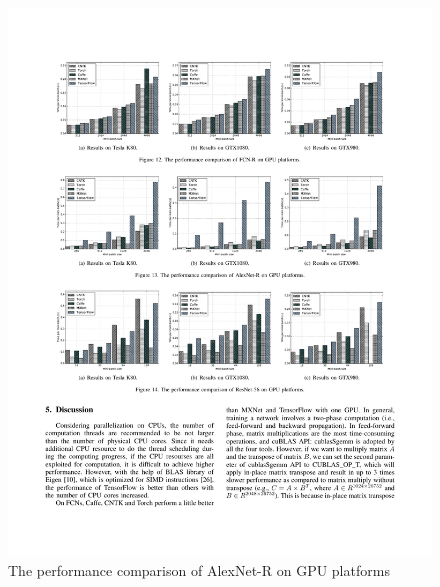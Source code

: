 \documentclass[11pt, oneside]{article}   	%
\begin{document}
\begin{figure}[htbp] 
	\includegraphics[width=\linewidth]{figures/AlexNet-R2.pdf} 
	\caption{The performance comparison of AlexNet-R on GPU platforms}
\end{figure}
%
\end{document}
